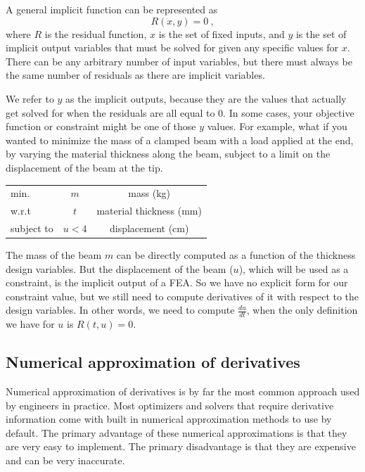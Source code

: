 \documentclass[conf]{new-aiaa}
\begin{document}
    A general implicit function can be represented as 
    \begin{equation}
        R(x,y) = 0 \ , 
    \end{equation}
    where $R$ is the residual function, $x$ is the set of fixed inputs, and $y$ is the set of implicit output variables that must be solved for given any specific values for $x$. 
    There can be any arbitrary number of input variables, but there must always be the same number of residuals as there are implicit variables. 

    We refer to $y$ as the implicit outputs, because they are the values that actually get solved for when the residuals are all equal to 0.
    In some cases, your objective function or constraint might be one of those $y$ values. 
    For example, what if you wanted to minimize the mass of a clamped beam with a load applied at the end, by varying the material thickness along the beam, subject to a limit on the displacement of the beam at the tip. 
    \begin{table}[H]
        \centering
        \begin{tabular}{lcc}
            \hline
            min. & $m$ & mass (kg)\\
            w.r.t & $t$ & material thickness (mm) \\ 
            subject to & $u < 4$ & displacement (cm)\\ \hline
        \end{tabular}
    \end{table}
    The mass of the beam $m$ can be directly computed as a function of the thickness design variables. 
    But the displacement of the beam ($u$), which will be used as a constraint, is the implicit output of a FEA. 
    So we have no explicit form for our constraint value, but we still need to compute derivatives of it with respect to the design variables. 
    In other words, we need to compute $\frac{du}{dt}$, when the only definition we have for $u$ is $R(t,u)=0$.

    

    \subsection{Numerical approximation of derivatives}
    Numerical approximation of derivatives is by far the most common approach used by engineers in practice. 
    Most optimizers and solvers that require derivative information come with built in numerical approximation methods to use by default. 
    The primary advantage of these numerical approximations is that they are very easy to implement.
    The primary disadvantage is that they are expensive and can be very inaccurate. 
\end{document}
